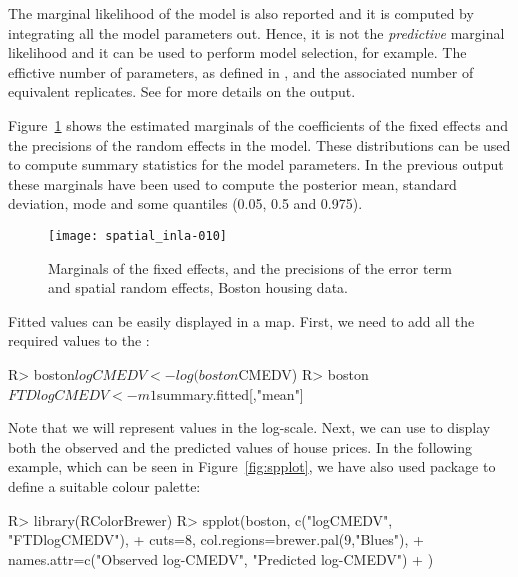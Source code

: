\documentclass[article]{jss}
\begin{document}
The marginal likelihood of the model is also reported and it is computed by
integrating all the model parameters out. Hence, it is not the {\em predictive}
marginal likelihood and it can be used to perform model selection, for example.
The effictive number of parameters, as defined in
\citet{Spiegelhalteretal:2002}, and the associated number of equivalent
replicates. See \citet{isi:000284021400008} for more details on the
 output.

Figure~\ref{fig:marg1} shows the estimated marginals of the coefficients
of the fixed effects and the precisions of the
random effects in the model. These distributions can be used to compute summary
statistics for the model parameters. In the previous  output
these marginals have been used to compute the posterior mean, standard 
deviation, mode and some quantiles (0.05, 0.5 and 0.975).


\begin{figure}[h]
\begin{center}
\texttt{[image: spatial\_inla-010]}
\end{center}
\caption{Marginals of the fixed effects, and the precisions of the error term 
and spatial random effects, Boston housing data.}
\label{fig:marg1}
\end{figure}


Fitted values can be easily displayed in a map. First, we need to add
all the required values to the :

\begin{Schunk}
\begin{Sinput}
R> boston$logCMEDV<-log(boston$CMEDV)
R> boston$FTDlogCMEDV<-m1$summary.fitted[,"mean"]
\end{Sinput}
\end{Schunk}
\noindent
Note that we will represent values in the log-scale. 
Next, we can use  to display both the observed and the 
predicted  values of house prices. In the following example, which
can be seen in Figure~\ref{fig:spplot}, we have
also used package  to define a suitable colour palette:
\begin{Schunk}
\begin{Sinput}
R> library(RColorBrewer)
R> spplot(boston, c("logCMEDV", "FTDlogCMEDV"),
+     cuts=8, col.regions=brewer.pal(9,"Blues"),
+     names.attr=c("Observed log-CMEDV", "Predicted log-CMEDV")
+  )
\end{Sinput}
\end{Schunk}
\end{document}
